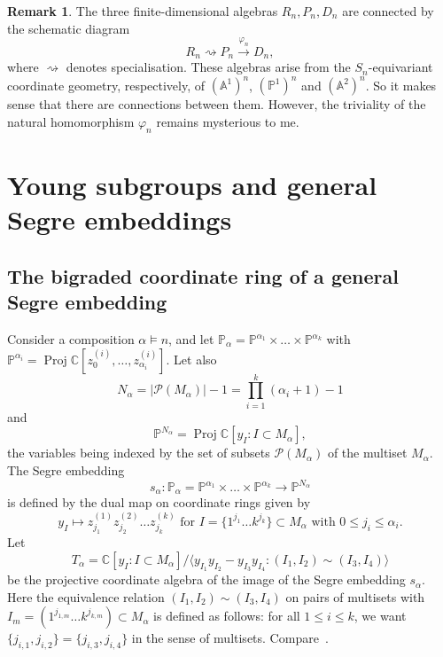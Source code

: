 \documentclass[a4paper,11pt]{amsart}
\theoremstyle{plain}
\theoremstyle{definition}
\newtheorem{remark}[theorem]{Remark}
\newcommand{\A}{\mathbb{A}}
\newcommand{\C}{\mathbb{C}}
\newcommand{\pa}{T} %
\renewcommand{\P}{\mathbb{P}}
\DeclareMathOperator{\Proj}{Proj}
\begin{document}
\begin{remark} \label{rem:PnDn} The three finite-dimensional algebras $R_n, P_n, D_n$ are connected by the schematic diagram
\[ R_n \rightsquigarrow P_n \stackrel{\varphi_n}\longrightarrow D_n, \]
where $\rightsquigarrow$ denotes specialisation. These algebras arise from the $S_n$-equivariant coordinate geometry, respectively, of $(\A^1)^n$, $(\P^1)^n$ and $(\A^2)^n$. So it makes sense that there are connections between them. However, the triviality of the natural homomorphism $\varphi_n$ remains mysterious to me. 
\end{remark}

\section{Young subgroups and general Segre embeddings}

\subsection{The bigraded coordinate ring of a general Segre embedding}\label{sec:Talpha} Consider a composition $\alpha \vDash n$, and
let $\P_\alpha = \P^{\alpha_1}\times \ldots \times \P^{\alpha_k}$ with 
$\P^{\alpha_i}=\Proj \C\left[z_0^{(i)},\ldots, z_{\alpha_i}^{(i)}\right]$.
Let also 
\[
N_\alpha = |{\mathcal P}(M_\alpha)| - 1 = \prod_{i=1}^k(\alpha_i+1) -1
\]
and 
\[\P^{N_\alpha} = \Proj \C\left[y_{I} \colon {I\subset M_\alpha}\right],\]
the variables being indexed by the set of subsets ${\mathcal P}(M_\alpha)$ of the multiset $M_\alpha$.
The Segre embedding
\[ s_\alpha\colon \P_\alpha = \P^{\alpha_1}\times \ldots \times \P^{\alpha_k}\rightarrow \P^{N_\alpha}
\]
is defined by the dual map on coordinate rings given by 
\[
y_{\scriptscriptstyle I}\mapsto z_{j_1}^{(1)}z_{j_2}^{(2)}\ldots z_{j_k}^{(k)} \mbox { for } I=\{1^{j_1}\ldots k^{j_k}\}\subset M_\alpha \mbox{ with } 0\leq j_i\leq \alpha_i. 
\]
Let 
\[\pa_\alpha  = \C\left[y_I \colon I\subset M_\alpha\right]/\langle y_{\scriptscriptstyle I_1} y_{\scriptscriptstyle I_2} - y_{\scriptscriptstyle I_3} y_{\scriptscriptstyle I_4}\colon (I_1,I_2)\sim (I_3,I_4)\rangle\]
be the projective coordinate algebra of the image of the Segre embedding $s_\alpha$. Here the equivalence relation 
$(I_1,I_2)\sim (I_3,I_4)$ on pairs of multisets with $I_m=(1^{j_{1,m}}\ldots k^{j_{k,m}})\subset M_\alpha$ is defined as follows: for all $1\leq i\leq k$, we want $\{ j_{i,1}, j_{i,2}\} = \{j_{i,3}, j_{i,4} \}$ in the sense of multisets. Compare~\cite[Section 4]{ORS}.
\end{document}
